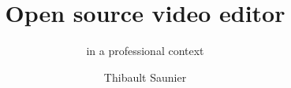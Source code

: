 \documentclass[a4paper,11pt]{article}
\begin{document}
\title{Open source video editor}
\subtitle{in a professional context}
\author{Thibault Saunier}
\withdate
\subject{Open source video editor in a professional context}
\maketitle

\tableofcontents






\end{document}
